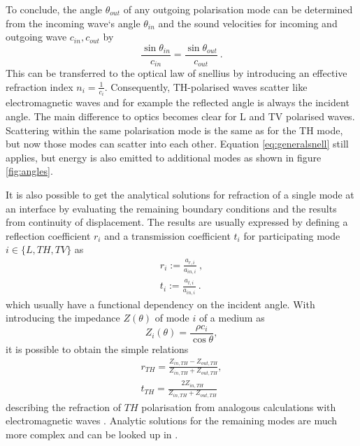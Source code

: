 To conclude, the angle $\theta_{out}$ of any outgoing polarisation mode can be
determined from the incoming wave`s angle $\theta_{in}$ and the sound
velocities for incoming and outgoing wave $c_{in}, c_{out}$ by
\begin{equation} \label{eq:generalsnell}
    \frac{\sin\theta_{in}}{c_{in}} =  \frac{\sin\theta_{out}}{c_{out}} \ .
\end{equation}
This can be transferred to the optical law of snellius by introducing an
effective refraction index $n_i = \frac{1}{c_i}$. Consequently, TH-polarised
waves scatter like electromagnetic waves and for example the reflected angle is
always the incident angle.
The main difference to optics becomes clear for L and TV polarised waves.
Scattering within the same polarisation mode is the same as for the TH mode,
but now those modes can scatter into each other. Equation \ref{eq:generalsnell}
still applies, but energy is also emitted to additional modes as shown in
figure \ref{fig:angles}.


It is also possible to get the analytical solutions for refraction of a single
mode at an interface by evaluating the remaining boundary conditions and the
results from continuity of displacement. The results are usually expressed by
defining a reflection coefficient $r_i$ and a transmission coefficient $t_i$
for participating mode $i \in\{L, TH, TV\}$ as
\begin{align}
    r_i := \frac{a_{r,i}}{a_{in,i}} \ , \\
    t_i := \frac{a_{t,i}}{a_{in,i}} \ .
\end{align}
which usually have a functional dependency on the incident angle. With
introducing the impedance $Z(\theta)$ of mode $i$ of a medium as
\begin{equation}
    Z_i(\theta ) = \frac{\rho c_i}{\cos\theta} ,
\end{equation}
it is possible to obtain the simple relations
\begin{align} \label{eq:theoSingleTH}
    r_{TH} = \frac{Z_{in,TH}-Z_{out,TH}}{Z_{in,TH}+Z_{out,TH}}, \\
    t_{TH} = \frac{2 Z_{in,TH}}{Z_{in,TH}+Z_{out,TH}}
\end{align}
describing the refraction of $TH$ polarisation from analogous calculations
with electromagnetic waves \cite[46,14]{brekhovskikh2012waves}. Analytic
solutions for the remaining modes are much more complex and can be looked up in
\cite[83]{ewing1957elastic}.

